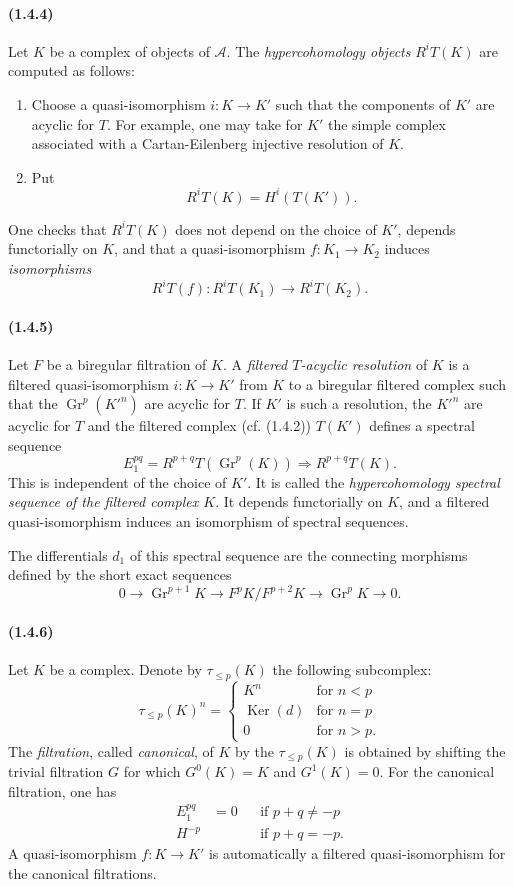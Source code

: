 \documentclass[10pt]{article}
\newcommand{\Gr}{\operatorname{Gr}}
\newcommand{\Ker}{\operatorname{Ker}}
\newcommand{\calA}{\mathcal A}
\begin{document}
\paragraph{(1.4.4)} Let $K$ be a complex of objects of $\calA$. The \emph{hypercohomology objects} $R^iT(K)$ are computed as follows:
\begin{enumerate}[label=\alph*)]
\item Choose a quasi-isomorphism $i:K\to K'$ such that the components of $K'$ are acyclic for $T$. For example, one may take for $K'$ the simple complex associated with a Cartan-Eilenberg injective resolution of $K$.
\item Put
\[
R^iT(K)=H^i(T(K')).
\]
\end{enumerate}
One checks that $R^iT(K)$ does not depend on the choice of $K'$, depends functorially on $K$, and that a quasi-isomorphism $f:K_1\to K_2$ induces \emph{isomorphisms}
\[
R^iT(f):R^iT(K_1)\longrightarrow R^iT(K_2).
\]

\paragraph{(1.4.5)} Let $F$ be a biregular filtration of $K$. A \emph{filtered $T$-acyclic resolution} of $K$ is a filtered quasi-isomorphism $i:K\to K'$ from $K$ to a biregular filtered complex such that the $\Gr^p(K'^n)$ are acyclic for $T$. If $K'$ is such a resolution, the $K'^n$ are acyclic for $T$ and the filtered complex (cf. (1.4.2)) $T(K')$ defines a spectral sequence
\[
E_1^{pq}=R^{p+q}T(\Gr^p(K))\Rightarrow R^{p+q}T(K).
\]
This is independent of the choice of $K'$. It is called the \emph{hypercohomology spectral sequence of the filtered complex $K$}. It depends functorially on $K$, and a filtered quasi-isomorphism induces an isomorphism of spectral sequences.

The differentials $d_1$ of this spectral sequence are the connecting morphisms defined by the short exact sequences
\[
0\to\Gr^{p+1}K\to F^pK/F^{p+2}K\to\Gr^pK\to0.
\]

\paragraph{(1.4.6)} Let $K$ be a complex. Denote by $\tau_{\le p}(K)$ the following subcomplex:
\[
\tau_{\le p}(K)^n=\begin{cases}
K^n& \text{for }n<p\\
\Ker(d)& \text{for }n=p\\
0& \text{for }n>p.
\end{cases}
\]
The \emph{filtration}, called \emph{canonical}, of $K$ by the $\tau_{\le p}(K)$ is obtained by shifting the trivial filtration $G$ for which $G^0(K)=K$ and $G^1(K)=0$. For the canonical filtration, one has
\[
\begin{aligned}
E_1^{pq}&=0 &&\text{if }p+q\ne-p\\
H^{-p} &&&\text{if }p+q=-p.
\end{aligned}
\]
A quasi-isomorphism $f:K\to K'$ is automatically a filtered quasi-isomorphism for the canonical filtrations.
\end{document}
